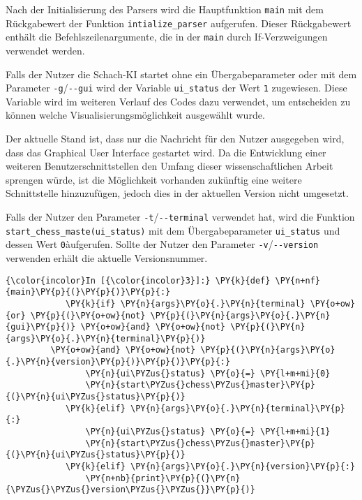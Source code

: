     Nach der Initialisierung des Parsers wird die Hauptfunktion
\texttt{main} mit dem Rückgabewert der Funktion
\texttt{intialize\_parser} aufgerufen. Dieser Rückgabewert enthält die
Befehlszeilenargumente, die in der \texttt{main} durch If-Verzweigungen
verwendet werden.

Falls der Nutzer die Schach-KI startet ohne ein Übergabeparameter oder
mit dem Parameter \texttt{-g}/\texttt{-\/-gui} wird der Variable
\texttt{ui\_status} der Wert \texttt{1} zugewiesen. Diese Variable wird
im weiteren Verlauf des Codes dazu verwendet, um entscheiden zu können
welche Visualisierungsmöglichkeit ausgewählt wurde.

Der aktuelle Stand ist, dass nur die Nachricht für den Nutzer ausgegeben
wird, dass das Graphical User Interface gestartet wird. Da die
Entwicklung einer weiteren Benutzerschnittstellen den Umfang dieser
wissenschaftlichen Arbeit sprengen würde, ist die Möglichkeit vorhanden
zukünftig eine weitere Schnittstelle hinzuzufügen, jedoch dies in der
aktuellen Version nicht umgesetzt.

Falls der Nutzer den Parameter \texttt{-t}/\texttt{-\/-terminal}
verwendet hat, wird die Funktion
\texttt{start\_chess\_maste(ui\_status)} mit dem Übergabeparameter
\texttt{ui\_status} und dessen Wert \texttt{0}àufgerufen. Sollte der
Nutzer den Parameter \texttt{-v}/\texttt{-\/-version} verwenden erhält
die aktuelle Versionsnummer.

    \begin{Verbatim}[commandchars=\\\{\}]
{\color{incolor}In [{\color{incolor}3}]:} \PY{k}{def} \PY{n+nf}{main}\PY{p}{(}\PY{p}{)}\PY{p}{:}
            \PY{k}{if} \PY{n}{args}\PY{o}{.}\PY{n}{terminal} \PY{o+ow}{or} \PY{p}{(}\PY{o+ow}{not} \PY{p}{(}\PY{n}{args}\PY{o}{.}\PY{n}{gui}\PY{p}{)} \PY{o+ow}{and} \PY{o+ow}{not} \PY{p}{(}\PY{n}{args}\PY{o}{.}\PY{n}{terminal}\PY{p}{)} 
	     \PY{o+ow}{and} \PY{o+ow}{not} \PY{p}{(}\PY{n}{args}\PY{o}{.}\PY{n}{version}\PY{p}{)}\PY{p}{)}\PY{p}{:}
                \PY{n}{ui\PYZus{}status} \PY{o}{=} \PY{l+m+mi}{0}
                \PY{n}{start\PYZus{}chess\PYZus{}master}\PY{p}{(}\PY{n}{ui\PYZus{}status}\PY{p}{)}
            \PY{k}{elif} \PY{n}{args}\PY{o}{.}\PY{n}{terminal}\PY{p}{:}
                \PY{n}{ui\PYZus{}status} \PY{o}{=} \PY{l+m+mi}{1}
                \PY{n}{start\PYZus{}chess\PYZus{}master}\PY{p}{(}\PY{n}{ui\PYZus{}status}\PY{p}{)}
            \PY{k}{elif} \PY{n}{args}\PY{o}{.}\PY{n}{version}\PY{p}{:}
                \PY{n+nb}{print}\PY{p}{(}\PY{n}{\PYZus{}\PYZus{}version\PYZus{}\PYZus{}}\PY{p}{)}
\end{Verbatim}

